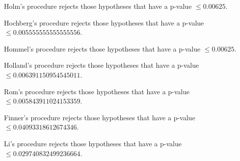 \documentclass[a4paper,10pt]{article}
\begin{document}
\begin{landscape}
Holm's procedure rejects those hypotheses that have a p-value $\le0.00625$.


Hochberg's procedure rejects those hypotheses that have a p-value $\le0.005555555555555556$.


Hommel's procedure rejects those hypotheses that have a p-value $\le0.00625$.


Holland's procedure rejects those hypotheses that have a p-value $\le0.006391150954545011$.


Rom's procedure rejects those hypotheses that have a p-value $\le0.005843911024153359$.


Finner's procedure rejects those hypotheses that have a p-value $\le0.04093318612674346$.


Li's procedure rejects those hypotheses that have a p-value $\le0.029740832499236664$.



\newpage


\end{landscape}
\end{document}
